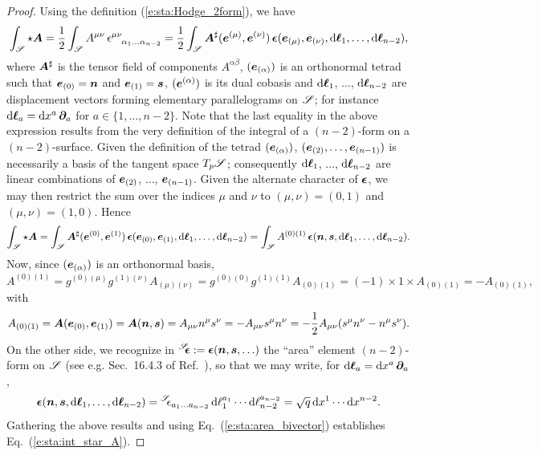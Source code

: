 \begin{proof}
Using the definition (\ref{e:sta:Hodge_2form}), we have
\[
    \int_{\mathscr{S}} \star \bm{A} =
        \frac{1}{2} \int_{\mathscr{S}} A^{\mu\nu} \,
        \epsilon^{\mu\nu}_{\ \ \; \alpha_1\ldots\alpha_{n-2}} =
         \frac{1}{2} \int_{\mathscr{S}} \bm{A}^\sharp (\bm{e}^{(\mu)}, \bm{e}^{(\nu)})
                \, \bm{\epsilon}(\bm{e}_{(\mu)}, \bm{e}_{(\nu)}, \mathrm{d}\bm{\ell}_{1},
                    \ldots, \mathrm{d}\bm{\ell}_{n-2}) ,
\]
where $\bm{A}^\sharp$ is the tensor field of components $A^{\alpha\beta}$,
$(\bm{e}_{(\alpha)})$ is an orthonormal tetrad such that
$\bm{e}_{(0)} = \bm{n}$ and $\bm{e}_{(1)} = \bm{s}$,
$(\bm{e}^{(\alpha)})$ is its dual cobasis and $\mathrm{d}\bm{\ell}_{1}$, $\ldots$, $\mathrm{d}\bm{\ell}_{n-2}$
are displacement vectors forming elementary parallelograms on $\mathscr{S}$; for instance
$\mathrm{d}\bm{\ell}_{a} = \mathrm{d} x^a \, \bm{\partial}_a$ for $a\in\{1, \ldots, n-2\}$.
Note that the last equality in the above expression results from the very
definition of the integral of a $(n-2)$-form on a $(n-2)$-surface.
Given the definition of the tetrad $(\bm{e}_{(\alpha)})$, $(\bm{e}_{(2)}, \ldots, \bm{e}_{(n-1)})$
is necessarily a basis of the tangent space $T_p\mathscr{S}$; consequently
$\mathrm{d}\bm{\ell}_{1}$, $\ldots$, $\mathrm{d}\bm{\ell}_{n-2}$ are linear combinations of $\bm{e}_{(2)}$,
$\ldots$, $\bm{e}_{(n-1)}$. Given the alternate character of $\bm{\epsilon}$,
we may then restrict the sum over the indices $\mu$ and $\nu$ to
$(\mu,\nu) = (0,1)$ and $(\mu,\nu) = (1,0)$.
Hence
\[
     \int_{\mathscr{S}} \star \bm{A}
     = \int_{\mathscr{S}}
    \bm{A}^\sharp (\bm{e}^{(0)}, \bm{e}^{(1)})
            \, \bm{\epsilon}(\bm{e}_{(0)}, \bm{e}_{(1)}, \mathrm{d}\bm{\ell}_{1}, \ldots , \mathrm{d}\bm{\ell}_{n-2})
    =  \int_{\mathscr{S}} A^{(0)(1)}
    \, \bm{\epsilon}(\bm{n}, \bm{s}, \mathrm{d}\bm{\ell}_{1}, \ldots , \mathrm{d}\bm{\ell}_{n-2}) .
\]
Now, since $(\bm{e}_{(\alpha)})$ is an orthonormal basis,
\[
  A^{(0)(1)} = g^{(0)(\mu)} g^{(1)(\nu)} A_{(\mu)(\nu)} = g^{(0)(0)} g^{(1)(1)}
    A_{(0)(1)} = (-1)\times 1 \times A_{(0)(1)} = - A_{(0)(1)} ,
\]
with
\[
    A_{(0)(1)} = \bm{A}(\bm{e}_{(0)}, \bm{e}_{(1)}) = \bm{A}(\bm{n}, \bm{s})
        = A_{\mu\nu} n^\mu s^\nu = - A_{\mu\nu} s^\mu n^\nu
        = - \frac{1}{2} A_{\mu\nu} (s^\mu n^\nu - n^\mu s^\nu) .
\]
On the other side, we recognize in ${}^{\mathscr{S}}\!\!\bm{\epsilon} := \bm{\epsilon}(\bm{n}, \bm{s}, \ldots)$ the
``area'' element $(n-2)$-form on $\mathscr{S}$ (see e.g. Sec.~16.4.3 of Ref.~\cite{Gourg13}),
so that we may write, for
$\mathrm{d}\bm{\ell}_{a} = \mathrm{d} x^a \, \bm{\partial}_a$,
\[
    \bm{\epsilon}(\bm{n}, \bm{s}, \mathrm{d}\bm{\ell}_{1}, \ldots , \mathrm{d}\bm{\ell}_{n-2}) =
        {}^{\mathscr{S}}\!\!\epsilon_{a_1\ldots a_{n-2}} \, \mathrm{d}\ell_{1}^{a_1}\cdots  \mathrm{d}\ell_{n-2}^{a_{n-2}}
        = \sqrt{q} \, \mathrm{d} x^1 \cdots  \mathrm{d} x^{n-2} .
\]
Gathering the above results and using Eq.~(\ref{e:sta:area_bivector})
establishes Eq.~(\ref{e:sta:int_star_A}).
\end{proof}

